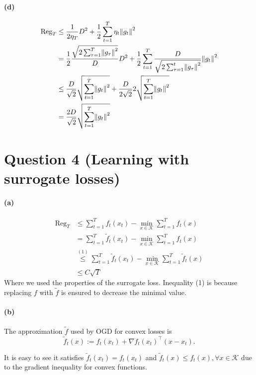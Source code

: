 \documentclass{article}
\DeclarePairedDelimiter\norm{\lVert}{\rVert}%
\newcommand{\Kcal}{\mathcal{K}}
\newcommand{\Reg}{\text{Reg}}
\newcommand{\fTilde}{\tilde{f}}
\begin{document}
\paragraph{(d)}
\begin{align*}
\Reg_T &\leq  \frac{1}{2\eta_T} D^2 + \frac{1}{2} \sum_{t=1}^T \eta_t \norm*{g_t}^2 \\
& =   \frac{1}{2}  \frac{\sqrt{2\sum_{\tau=1}^T \norm*{g_\tau}^2}}{D} D^2 + \frac{1}{2} \sum_{t=1}^T \frac{D}{\sqrt{2\sum_{\tau=1}^t \norm*{g_\tau}^2}} \norm*{g_t}^2 \\
& \leq \frac{D}{\sqrt{2}} \sqrt{\sum_{t=1}^{T} \norm*{g_t}^2} + \frac{D}{2\sqrt{2}} 2\sqrt{\sum_{t=1}^{T} \norm*{g_t}^2} \\
& =  \frac{2 D}{\sqrt{2}} \sqrt{\sum_{t=1}^{T} \norm*{g_t}^2}
\end{align*}

\section{Question 4 (Learning with surrogate losses)}

\paragraph{(a)}
\begin{align*}
\Reg_T & \leq \sum_{t=1}^T f_t(x_t) - \min_{x \in \Kcal} \sum_{t=1}^T f_t(x) \\
& = \sum_{t=1}^T \fTilde_t(x_t) - \min_{x \in \Kcal} \sum_{t=1}^T f_t(x)  \\
& \stackrel{(1)}{\leq} \sum_{t=1}^T \fTilde_t(x_t)- \min_{x \in \Kcal} \sum_{t=1}^T \fTilde_t(x) \\
& \leq C \sqrt{T}
\end{align*}
Where we used the properties of the surrogate loss.
Inequality (1) is because replacing $f$ with $\fTilde$ is ensured to decrease the minimal value.

\paragraph{(b)}
The approximation $\fTilde$ used by OGD for convex losses is 
\begin{equation*}
    \fTilde_t(x) := f_t(x_t) + \nabla f_t(x_t)^\top (x-x_t).
\end{equation*}

It is easy to see it satisfies $\fTilde_t(x_t)=f_t(x_t)$  and  $\fTilde_t(x)\leq f_t(x), \forall x \in \Kcal$ due to the gradient inequality for convex functions.
 



\end{document}
